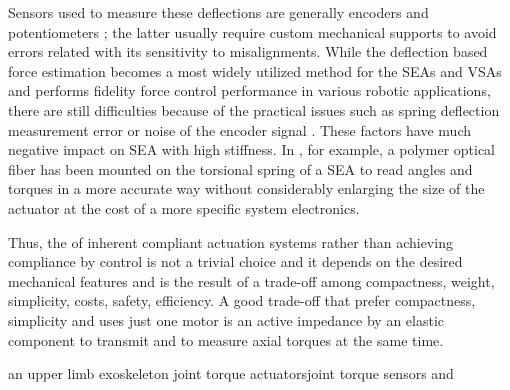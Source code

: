 Sensors used to measure these deflections are generally encoders \cite{dos2017design} and potentiometers \cite{junior2016series}; the latter usually require custom mechanical supports to avoid errors related with its sensitivity to misalignments.
While the deflection based force estimation becomes a most widely utilized method for the SEAs and VSAs and performs fidelity force control performance in various robotic applications, there are still difficulties because of the practical issues such as spring deflection measurement error or noise of the encoder signal \cite{lee2018integrated}. These factors have much negative impact on SEA with high stiffness. In \cite{leal2018polymer}, for example, a polymer optical fiber has been mounted on the torsional spring of a SEA to read angles and torques in a more accurate way without considerably enlarging the size of the actuator at the cost of a more specific system electronics.
\par Thus, the \DIFdelbegin {}\DIFdelend \DIFaddbegin {}\DIFaddend of inherent compliant actuation systems rather than achieving compliance by control  \DIFdelbegin {}\DIFdelend is not a trivial choice and it depends on the desired mechanical features and is the result of a trade-off among compactness, weight, simplicity, costs, safety, efficiency\DIFdelbegin {}\DIFdelend .
A good trade-off that prefer compactness, simplicity and uses just one motor is an active impedance by \DIFdelbegin {}\DIFdelend \DIFaddbegin {}\DIFaddend an elastic component to transmit and to measure axial torques at the same time.


\par 
\DIFdelbegin {}\DIFdelend \DIFaddbegin {}\DIFaddend an upper limb exoskeleton \DIFdelbegin {}\DIFdelend \DIFaddbegin {}\DIFaddend joint torque actuators\DIFdelbegin {}\DIFdelend \DIFaddbegin {}\DIFaddend joint torque sensors and \DIFdelbegin {}\DIFdelend \DIFaddbegin {} 

